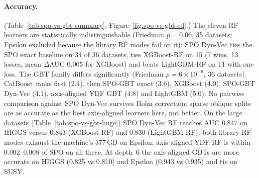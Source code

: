\paragraph{Accuracy.}
(Table~\ref{tab:spo-vs-gbt-summary}, Figure~\ref{fig:spo-vs-gbt-cd}.) The eleven RF learners
are statistically indistinguishable (Friedman $p=0.06$, 35 datasets; Epsilon excluded because
the library RF modes fail on it): SPO Dyn-Vec ties the SPO exact baseline on 34 of 36 datasets,
ties XGBoost-RF on 15 (7 wins, 13 losses, mean $\Delta$AUC $0.005$ for XGBoost) and beats
LightGBM-RF on 11 with one loss. The GBT family differs significantly (Friedman
$p=6\times10^{-6}$, 36 datasets): CatBoost ranks first (2.4), then SPO-GBT exact (3.6), XGBoost
(4.0), SPO-GBT Dyn-Vec (4.1), axis-aligned YDF GBT (4.8) and LightGBM (5.0). No pairwise
comparison against SPO Dyn-Vec survives Holm correction: sparse oblique splits are as accurate
as the best axis-aligned learners here, not better. On the large datasets
(Table~\ref{tab:spo-vs-gbt-huge}) SPO Dyn-Vec RF reaches AUC 0.847 on HIGGS versus 0.843
(XGBoost-RF) and 0.830 (LightGBM-RF); both library RF modes exhaust the machine's 377\,GB on
Epsilon; axis-aligned YDF RF is within 0.002--0.008 of SPO on all three. At depth~6 the
axis-aligned GBTs are more accurate on HIGGS (0.825 vs 0.810) and Epsilon (0.943 vs 0.935) and
tie on SUSY.




